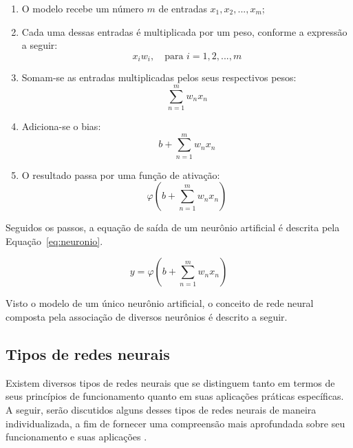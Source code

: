 \begin{enumerate}
    \item O modelo recebe um número $m$ de entradas $x_1, x_2, ..., x_m$;
    \item Cada uma dessas entradas é multiplicada por um peso, conforme a expressão a seguir:
    \begin{equation}
        x_i w_i, \quad \text{para } i = 1, 2, ..., m
        \label{eq:entrada_peso}
    \end{equation}
    \item Somam-se as entradas multiplicadas pelos seus respectivos pesos:
    \begin{equation}
        \sum_{n=1}^{m} w_n x_n
        \label{eq:soma_pesos}
    \end{equation}
    \item Adiciona-se o bias:
    \begin{equation}
        b + \sum_{n=1}^{m} w_n x_n
        \label{eq:bias}
    \end{equation}
    \item O resultado passa por uma função de ativação:
    \begin{equation}
        \varphi \left( b + \sum_{n=1}^{m} w_n x_n \right)
        \label{eq:ativacao}
    \end{equation}
\end{enumerate}

Seguidos os passos, a equação de saída de um neurônio artificial é descrita pela Equação~\ref{eq:neuronio}.

\begin{equation}
    y = \varphi \left( b + \sum_{n=1}^{m} w_n x_n \right)
    \label{eq:neuronio}
\end{equation}

Visto o modelo de um único neurônio artificial, o conceito de rede neural composta pela associação de diversos neurônios é descrito a seguir.

\subsection{Tipos de redes neurais}

Existem diversos tipos de redes neurais que se distinguem tanto em termos de seus princípios de funcionamento quanto em suas aplicações práticas específicas. A seguir, serão discutidos alguns desses tipos de redes neurais de maneira individualizada, a fim de fornecer uma compreensão mais aprofundada sobre seu funcionamento e suas aplicações \cite{alex2020}.

